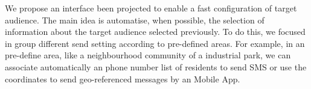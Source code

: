 We propose an interface been projected to enable a fast configuration of target audience. The main idea is automatise, when possible, the selection of information about the target audience selected previously. To do this, we focused in group different send setting according to pre-defined areas. For example, in an pre-define area, like a neighbourhood community of a industrial park, we can associate automatically an phone number list of residents to send SMS or use the coordinates to send geo-referenced messages by an Mobile App. %
